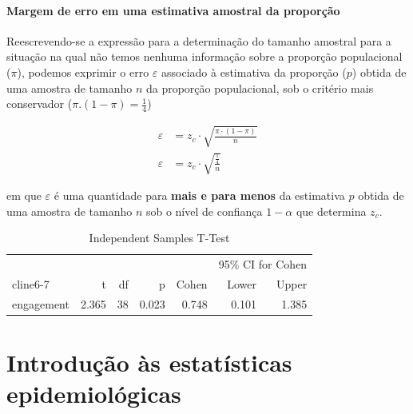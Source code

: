 \documentclass[
]{book}
\begin{document}
\hfill\break

\hypertarget{margem-de-erro-em-uma-estimativa-amostral-da-proporuxe7uxe3o}{%
\subsubsection{Margem de erro em uma estimativa amostral da proporção}\label{margem-de-erro-em-uma-estimativa-amostral-da-proporuxe7uxe3o}}

\hfill\break

Reescrevendo-se a expressão para a determinação do tamanho amostral para a situação na qual não temos nenhuma informação sobre a proporção populacional (\(\pi\)), podemos exprimir o erro \(\varepsilon\) associado à estimativa da proporção (\(p\)) obtida de uma amostra de tamanho \(n\) da proporção populacional, sob o critério mais conservador (\(\pi.(1-\pi)=\frac{1}{4}\))

\hfill\break

\begin{align*}
\varepsilon & = z_{c}\cdot \sqrt{\frac{\pi\cdot \left(1-\pi\right)}{n}} \\
\varepsilon & = z_{c}\cdot \sqrt{\frac{\frac{1}{4}}{n}}
\end{align*}

\hfill\break

em que \(\varepsilon\) é uma quantidade para \textbf{mais e para menos} da estimativa \(p\) obtida de uma amostra de tamanho \(n\) sob o nível de confiança \(1-\alpha\) que determina \(z_{c}\).

\begin{table}[h]
\centering
\caption{Independent Samples T-Test}
\label{tab:independentSamplesT-Test}
{
\begin{tabular}{lrrrrrr}
\toprule
\multicolumn{1}{c}{} & \multicolumn{1}{c}{} & \multicolumn{1}{c}{} & \multicolumn{1}{c}{} & \multicolumn{1}{c}{} & \multicolumn{2}{c}{95\% CI for Cohen} \\
cline{6-7}
& t & df & p & Cohen & Lower & Upper  \\
\cmidrule[0.4pt]{1-7}
engagement & 2.365 & 38 & 0.023 & 0.748 & 0.101 & 1.385  \\
\bottomrule
\end{tabular}
}
\end{table}

\hypertarget{introduuxe7uxe3o-uxe0s-estatuxedsticas-epidemioluxf3gicas}{%
\chapter{Introdução às estatísticas epidemiológicas}\label{introduuxe7uxe3o-uxe0s-estatuxedsticas-epidemioluxf3gicas}}
\end{document}
